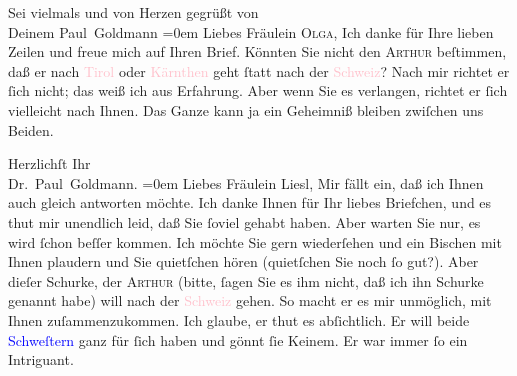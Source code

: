 \pstart
           {\pb}Sei vielmals und von Herzen gegrüßt von {\\[\baselineskip]}Deinem
                  \spacefill\mbox{Paul Goldmann}\pend
           \leftskip=0em{}{\bigskip}
\pstart
           \noindent{}Liebes Fräulein \textsc{Olga}, Ich
               danke für Ihre lieben Zeilen und freue mich auf Ihren Brief. Könnten Sie nicht den
                  \textsc{Arthur} beſtimmen, daß er nach \textcolor{pink}{Tirol}{}\ledrightnote{\textcolor{pink}{Tirol}} oder \textcolor{pink}{Kärnthen}{}\ledrightnote{\textcolor{pink}{Kärnten}} geht
               ſtatt nach der \textcolor{pink}{Schweiz}{}\ledrightnote{\textcolor{pink}{Schweiz}}? Nach mir richtet er
               ſich nicht; das weiß ich aus Erfahrung. Aber wenn Sie es verlangen, richtet er ſich
               vielleicht nach Ihnen. Das Ganze kann ja ein Geheimniß bleiben zwiſchen uns  Beiden.\pend
           
\pstart
           Herzlichſt Ihr {\\[\baselineskip]}\spacefill\mbox{Dr. Paul Goldmann.}\pend
           \leftskip=0em{}{\bigskip}
\pstart{}{\pb}Liebes Fräulein Liesl,\pend
\pstart
           Mir fällt ein, daß ich Ihnen auch gleich antworten möchte. Ich danke Ihnen für Ihr
               liebes Briefchen, und es thut mir unendlich leid, daß Sie ſoviel \label{K_L03071-12v}\label{K_L03071-12h} gehabt
               haben. Aber warten Sie nur, es wird ſchon beſſer kommen. Ich möchte Sie gern
               wiederſehen und ein Bischen mit Ihnen plaudern und Sie quietſchen hören (quietſchen
               Sie noch ſo gut?). Aber dieſer {\pb}Schurke, der \textsc{Arthur} (bitte,  ſagen Sie es ihm \strikeout{\textcolor{gray}{×}\-\textcolor{gray}{×}\-\textcolor{gray}{×}} nicht, daß ich ihn Schurke genannt habe) will nach der \textcolor{pink}{Schweiz}{}\ledrightnote{\textcolor{pink}{Schweiz}} gehen. So macht er es mir unmöglich, mit Ihnen
               zuſammenzukommen. Ich glaube, er thut es abſichtlich. Er will beide \textcolor{blue}{Schweſtern}{}\ledrightnote{\textcolor{blue}{Olga Schnitzler}{\newline}\textcolor{blue}{Elisabeth Steinrück}} ganz für ſich haben und gönnt ſie Keinem.
               Er war immer ſo ein Intriguant.\pend
           
